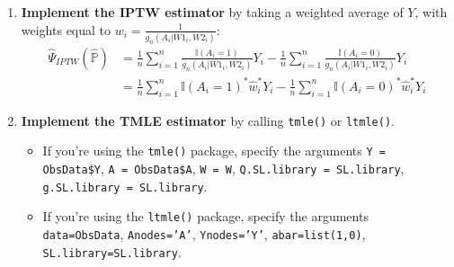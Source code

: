 \documentclass[answers]{exam}
\begin{document}
\begin{enumerate}
\begin{enumerate}
\begin{Schunk}
\end{Schunk}
\end{enumerate}
\item \textbf{Implement the IPTW estimator} by taking a weighted average of $Y$, with weights equal to $w_i = $:
\begin{align*}
\hat{\Psi}_{IPTW}(\hat{\mathbb{P}})  & = \frac{1}{n}\sum_{i=1}^n \frac{\mathbb{I}(A_i=1)}{g_n(A_i|W1_i, W2_i)} Y_i - \frac{1}{n}\sum_{i=1}^n \frac{\mathbb{I}(A_i=0)}{g_n(A_i|W1_i, W2_i)} Y_i \\
& = \frac{1}{n}\sum_{i=1}^n \mathbb{I}(A_i=1)^*\hat{w}_i^*Y_i - \frac{1}{n}\sum_{i=1}^n \mathbb{I}(A_i=0)^*\hat{w}_i^*Y_i
\end{align*}
\item \textbf{Implement the TMLE estimator} by calling \texttt{tmle()} or \texttt{ltmle()}.
\begin{itemize}
\item If you're using the \texttt{tmle()} package, specify the arguments \texttt{Y = ObsData\$Y}, \texttt{A = ObsData\$A}, \texttt{W = W}, \texttt{Q.SL.library = SL.library}, \texttt{g.SL.library = SL.library}. 
\item If you're using the \texttt{ltmle()} package, specify the arguments \texttt{data=ObsData}, \texttt{Anodes='A'}, \texttt{Ynodes='Y'}, \texttt{abar=list(1,0)}, \texttt{SL.library=SL.library}. 
\end{itemize}
\end{enumerate}
\end{document}

